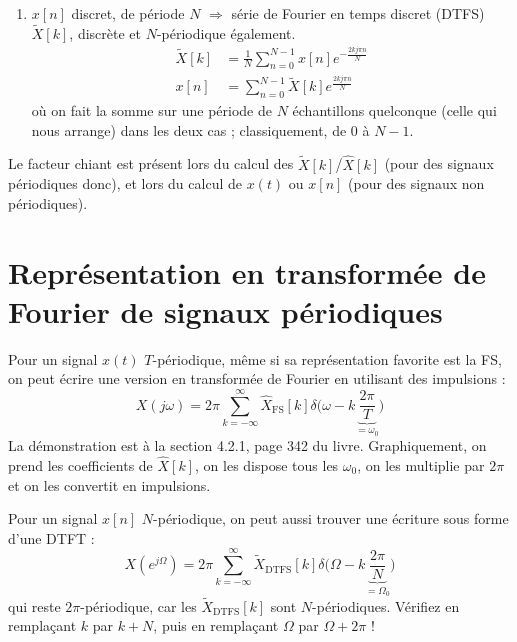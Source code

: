 \documentclass{article}
\begin{document}
\begin{enumerate}
	\item $x[n]$ discret, de période $N$ $\Rightarrow$ série de Fourier en temps discret (DTFS) $\tilde{X}[k]$, discrète et $N$-périodique également.
	\begin{align}
	\tilde{X}[k] &= \frac{1}{N} \sum_{n=0}^{N-1} x[n] e^{-\frac{2kj\pi n}{N}} \label{eq:dtfs_from_xn_def} \\
	x[n] &= \sum_{n=0}^{N-1} \tilde{X}[k] e^{\frac{2kj\pi n}{N}} \label{eq:xn_from_dtfs_def}
	\end{align}
	où on fait la somme sur une période de $N$ échantillons quelconque (celle qui nous arrange) dans les deux cas ; classiquement, de $0$ à $N-1$.
\end{enumerate}

Le facteur chiant est présent lors du calcul des $\tilde{X}[k]$/$\hat{X}[k]$ (pour des signaux périodiques donc), et lors du calcul de $x(t)$ ou $x[n]$ (pour des signaux non périodiques).

\section{Représentation en transformée de Fourier de signaux périodiques}


Pour un signal $x(t)$ $T$-périodique, même si sa représentation favorite est la FS, on peut écrire une version en transformée de Fourier en utilisant des impulsions :
\begin{equation}
X(j\omega) = 2\pi \sum_{k=-\infty}^{\infty} \hat{X}_\mathrm{FS}[k] \delta\bigg( \omega - k \underbrace{\frac{2\pi}{T}}_{=\omega_0} \bigg)
\label{eq:fs_to_ft}
\end{equation}
La démonstration est à la section 4.2.1, page 342 du livre. Graphiquement, on prend les coefficients de $\hat{X}[k]$, on les dispose tous les $\omega_0$, on les multiplie par $2\pi$ et on les convertit en impulsions.

Pour un signal $x[n]$ $N$-périodique, on peut aussi trouver une écriture sous forme d'une DTFT :
\begin{equation}
X\left(e^{j\Omega}\right) = 2\pi \sum_{k=-\infty}^{\infty} \tilde{X}_\mathrm{DTFS}[k] \delta\bigg( \Omega - k \underbrace{\frac{2\pi}{N}}_{=\Omega_0} \bigg)
\label{eq:dtfs_to_dtft}
\end{equation}
qui reste $2\pi$-périodique, car les $\tilde{X}_\mathrm{DTFS}[k]$ sont $N$-périodiques. Vérifiez en remplaçant $k$ par $k+N$, puis en remplaçant $\Omega$ par $\Omega+2\pi$ !
\end{document}
